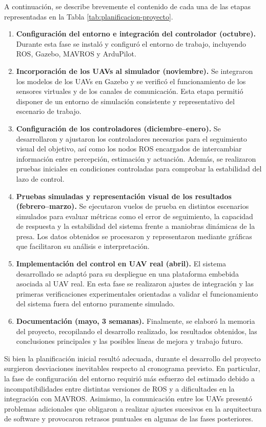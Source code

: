 A continuación, se describe brevemente el contenido de cada una de las etapas representadas en la Tabla \ref{tab:planificacion-proyecto}.

\begin{enumerate}
    \item \textbf{Configuración del entorno e integración del controlador (octubre).} Durante esta fase se instaló y configuró el entorno de trabajo, incluyendo ROS, Gazebo, MAVROS y ArduPilot.
    \item \textbf{Incorporación de los UAVs al simulador (noviembre).} Se integraron los modelos de los UAVs en Gazebo y se verificó el funcionamiento de los sensores virtuales y de los canales de comunicación. Esta etapa permitió disponer de un entorno de simulación consistente y representativo del escenario de trabajo.
    \item \textbf{Configuración de los controladores (diciembre--enero).} Se desarrollaron y ajustaron los controladores necesarios para el seguimiento visual del objetivo, así como los nodos ROS encargados de intercambiar información entre percepción, estimación y actuación. Además, se realizaron pruebas iniciales en condiciones controladas para comprobar la estabilidad del lazo de control.
    \item \textbf{Pruebas simuladas y representación visual de los resultados (febrero--marzo).} Se ejecutaron vuelos de prueba en distintos escenarios simulados para evaluar métricas como el error de seguimiento, la capacidad de respuesta y la estabilidad del sistema frente a maniobras dinámicas de la presa. Los datos obtenidos se procesaron y representaron mediante gráficas que facilitaron su análisis e interpretación.
    \item \textbf{Implementación del control en UAV real (abril).} El sistema desarrollado se adaptó para su despliegue en una plataforma embebida asociada al UAV real. En esta fase se realizaron ajustes de integración y las primeras verificaciones experimentales orientadas a validar el funcionamiento del sistema fuera del entorno puramente simulado.
    \item \textbf{Documentación (mayo, 3 semanas).} Finalmente, se elaboró la memoria del proyecto, recopilando el desarrollo realizado, los resultados obtenidos, las conclusiones principales y las posibles líneas de mejora y trabajo futuro.
\end{enumerate}

\vspace{0.4cm}
Si bien la planificación inicial resultó adecuada, durante el desarrollo del proyecto surgieron desviaciones inevitables respecto al cronograma previsto. En particular, la fase de configuración del entorno requirió más esfuerzo del estimado debido a incompatibilidades entre distintas versiones de ROS y a dificultades en la integración con MAVROS. Asimismo, la comunicación entre los UAVs presentó problemas adicionales que obligaron a realizar ajustes sucesivos en la arquitectura de software y provocaron retrasos puntuales en algunas de las fases posteriores.

